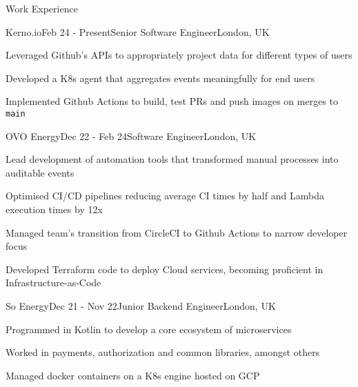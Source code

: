 \documentclass{resume} %
\begin{document}

\begin{rSection}{Work Experience}
    \begin{rSubsection}{Kerno.io}{Feb 24 - Present}{Senior Software Engineer}{London, UK}
    \item Leveraged Github's APIs to appropriately project data for different types of users    
    \item Developed a K8s agent that aggregates events meaningfully for end users
    \item Implemented Github Actions to build, test PRs and push images on merges to \texttt{main}
  \end{rSubsection}
  \begin{rSubsection}{OVO Energy}{Dec 22 - Feb 24}{Software Engineer}{London, UK}
    \item Lead development of automation tools that transformed manual processes into auditable events
    \item Optimised CI/CD pipelines reducing average CI times by half and Lambda execution times by 12x 
    \item Managed team’s transition from CircleCI to Github Actions to narrow developer focus
    \item Developed Terraform code to deploy Cloud services, becoming proficient in Infrastructure-as-Code
  \end{rSubsection}
  \begin{rSubsection}{So Energy}{Dec 21 - Nov 22}{Junior Backend Engineer}{London, UK}
    \item Programmed in Kotlin to develop a core ecosystem of microservices
    \item Worked in payments, authorization and common libraries, amongst others
    \item Managed docker containers on a K8s engine hosted on GCP
  \end{rSubsection}
  

\end{rSection}
\end{document}
